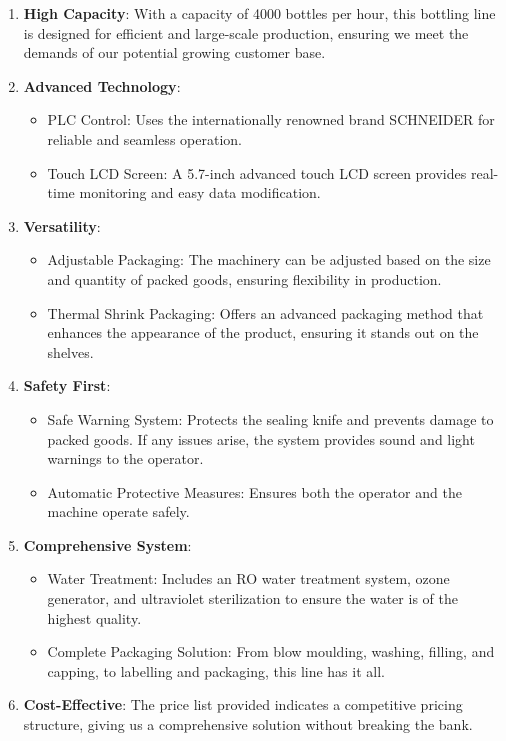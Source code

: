 \documentclass{article}
\begin{document}
\begin{enumerate}
    \item \textbf{High Capacity}: With a capacity of 4000 bottles per hour, this bottling line is designed for efficient and large-scale production, ensuring we meet the demands of our potential growing customer base.
    \item \textbf{Advanced Technology}:
    \begin{itemize}
        \item PLC Control: Uses the internationally renowned brand SCHNEIDER for reliable and seamless operation.
        \item Touch LCD Screen: A 5.7-inch advanced touch LCD screen provides real-time monitoring and easy data modification.
    \end{itemize}
    \item \textbf{Versatility}:
    \begin{itemize}
        \item Adjustable Packaging: The machinery can be adjusted based on the size and quantity of packed goods, ensuring flexibility in production.
        \item Thermal Shrink Packaging: Offers an advanced packaging method that enhances the appearance of the product, ensuring it stands out on the shelves.
    \end{itemize}
    \item \textbf{Safety First}:
    \begin{itemize}
        \item Safe Warning System: Protects the sealing knife and prevents damage to packed goods. If any issues arise, the system provides sound and light warnings to the operator.
        \item Automatic Protective Measures: Ensures both the operator and the machine operate safely.
    \end{itemize}
    \item \textbf{Comprehensive System}:
    \begin{itemize}
        \item Water Treatment: Includes an RO water treatment system, ozone generator, and ultraviolet sterilization to ensure the water is of the highest quality.
        \item Complete Packaging Solution: From blow moulding, washing, filling, and capping, to labelling and packaging, this line has it all.
    \end{itemize}
    \item \textbf{Cost-Effective}: The price list provided indicates a competitive pricing structure, giving us a comprehensive solution without breaking the bank.

\end{enumerate}
\end{document}
